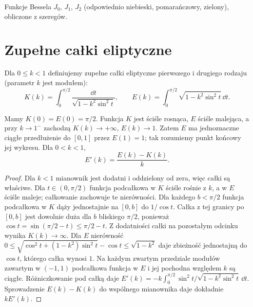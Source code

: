 \begin{center}
\small Funkcje Bessela $J_0$, $J_1$, $J_2$ (odpowiednio niebieski, pomarańczowy, zielony), obliczone z szeregów.
\end{center}

\section{Zupełne całki eliptyczne}
\begin{definicja}
\label{ma1:def:elliptic-integrals}
Dla $0\le k<1$ definiujemy zupełne całki eliptyczne
pierwszego i drugiego rodzaju (parametr $k$ jest modułem):
\[
 K(k)=\int_0^{\pi/2}\frac{\dd t}{\sqrt{1-k^2\sin^2t}},
 \qquad
 E(k)=\int_0^{\pi/2}\sqrt{1-k^2\sin^2t}\,\dd t.
\]
\end{definicja}
\begin{stwierdzenie}
\label{ma1:prop:elliptic-integrals}
Mamy $K(0)=E(0)=\pi/2$.
Funkcja $K$ jest ściśle rosnąca, $E$ ściśle malejąca,
a przy $k\to1^-$ zachodzą $K(k)\to+\infty$, $E(k)\to1$.
Zatem $E$ ma jednoznaczne ciągłe przedłużenie
do $[0,1]$ przez $E(1)=1$; tak rozumiemy punkt
końcowy jej wykresu.
Dla $0<k<1$,
\[
 E'(k)=\frac{E(k)-K(k)}k .
\]
\end{stwierdzenie}
\begin{proof}
Dla $k<1$ mianownik jest dodatni i oddzielony od zera,
więc całki są właściwe. Dla $t\in(0,\pi/2)$
funkcja podcałkowa w $K$ ściśle rośnie z $k$, a w $E$
ściśle maleje; całkowanie zachowuje te nierówności.
Dla każdego $b<\pi/2$ funkcja podcałkowa w $K$ dąży
jednostajnie na $[0,b]$ do $1/\cos t$.
Całka z tej granicy po $[0,b]$ jest dowolnie duża
dla $b$ bliskiego $\pi/2$, ponieważ
$\cos t=\sin(\pi/2-t)\le\pi/2-t$.
Z dodatniości całki na pozostałym odcinku wynika
$K(k)\to\infty$. Dla $E$ nierówność
$0\le\sqrt{\cos^2t+(1-k^2)\sin^2t}-\cos t
\le\sqrt{1-k^2}$ daje zbieżność jednostajną do $\cos t$,
którego całka wynosi $1$.
Na każdym zwartym przedziale modułów zawartym
w $(-1,1)$ podcałkowa funkcja w $E$ i jej pochodna
względem $k$ są ciągłe. Różniczkowanie pod całką daje
$E'(k)=-k\int_0^{\pi/2}\sin^2t/\sqrt{1-k^2\sin^2t}\,\dd t$.
Sprowadzenie $E(k)-K(k)$ do wspólnego mianownika
daje dokładnie $kE'(k)$.
\end{proof}

